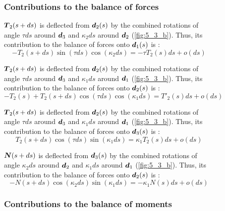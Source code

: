\begin{figure}[p]
	\begin{fullpage}
	\subsubsection{Contributions to the balance of forces}
	\vspace{10pt}
	
	$\boldsymbol{T}_2(s+ds)$ is deflected from $\boldsymbol{d}_2(s)$ by the combined rotations of angle $\tau ds$ around $\boldsymbol{d}_3$ and $\kappa_2 ds$ around $\boldsymbol{d}_2$ (\cref{fig:5_3_b}). Thus, its contribution to the balance of forces onto $\boldsymbol{d}_1(s)$ is : 
	\begin{equation*}
		-T_2(s+ds) \sin(\tau ds) \cos(\kappa_2 ds) = -\tau T_2(s) ds + o(ds)
	\end{equation*}	
	
	$\boldsymbol{T}_2(s+ds)$ is deflected from $\boldsymbol{d}_2(s)$ by the combined rotations of angle $\tau ds$ around $\boldsymbol{d}_3$ and $\kappa_1 ds$ around $\boldsymbol{d}_1$ (\cref{fig:5_3_b}). Thus, its contribution to the balance of forces onto $\boldsymbol{d}_2(s)$ is : 
	\begin{equation*}
		-T_2(s) + T_2(s+ds) \cos(\tau ds) \cos(\kappa_1 ds) = T'_2 (s) ds + o(ds)
	\end{equation*}	
	
	$\boldsymbol{T}_2(s+ds)$ is deflected from $\boldsymbol{d}_2(s)$ by the combined rotations of angle $\tau ds$ around $\boldsymbol{d}_3$ and $\kappa_1 ds$ around $\boldsymbol{d}_1$ (\cref{fig:5_3_b}). Thus, its contribution to the balance of forces onto $\boldsymbol{d}_3(s)$ is : 
	\begin{equation*}
		T_2(s+ds) \cos(\tau ds) \sin(\kappa_1 ds) = \kappa_1 T_2(s) ds + o(ds)
	\end{equation*}
		
	$\boldsymbol{N}(s+ds)$ is deflected from $\boldsymbol{d}_3(s)$ by the combined rotations of angle $\kappa_2 ds$ around $\boldsymbol{d}_2$ and $\kappa_1 ds$ around $\boldsymbol{d}_1$ (\cref{fig:5_3_b}). Thus, its contribution to the balance of forces onto $\boldsymbol{d}_2(s)$ is : 
	\begin{equation*}
		-N(s+ds) \cos(\kappa_2 ds) \sin(\kappa_1 ds) = -\kappa_1 N(s) ds + o(ds)
	\end{equation*}	
	\vspace{10pt}

	\subsubsection{Contributions to the balance of moments}
	\vspace{10pt}
	

\end{fullpage}
\end{figure}
